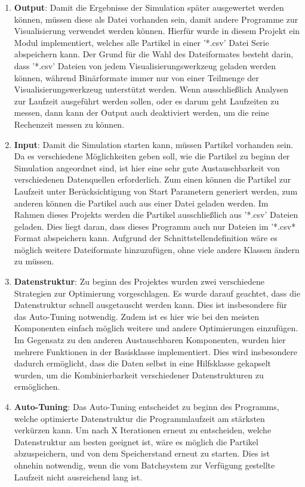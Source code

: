 \documentclass[
12pt,
a4paper,
BCOR10mm,
DIV14,
headsepline,
]{scrreprt}
\begin{document}
	\begin{enumerate}
		\item \textbf{Output}: Damit die Ergebnisse der Simulation später ausgewertet werden können, müssen diese als Datei vorhanden sein, damit andere Programme zur Visualisierung verwendet werden können. Hierfür wurde in diesem Projekt ein Modul implementiert, welches alle Partikel in einer '*.csv' Datei Serie abspeichern kann. Der Grund für die Wahl des Dateiformates besteht darin, dass '*.csv' Dateien von jedem Visualisierungswerkzeug geladen werden können, während Binärformate immer nur von einer Teilmenge der Visualisierungswerkzeug unterstützt werden. Wenn ausschließlich Analysen zur Laufzeit ausgeführt werden sollen, oder es darum geht Laufzeiten zu messen, dann kann der Output auch deaktiviert werden, um die reine Rechenzeit messen zu können.
		\item \textbf{Input}: Damit die Simulation starten kann, müssen Partikel vorhanden sein. Da es verschiedene Möglichkeiten geben soll, wie die Partikel zu beginn der Simulation angeordnet sind, ist hier eine sehr gute Austauschbarkeit von verschiedenen Datenquellen erforderlich. Zum einen können die Partikel zur Laufzeit unter Berücksichtigung von Start Parametern generiert werden, zum anderen können die Partikel auch aus einer Datei geladen werden. Im Rahmen dieses Projekts werden die Partikel ausschließlich aus '*.csv' Dateien geladen. Dies liegt daran, dass dieses Programm auch nur Dateien im '*.csv* Format abspeichern kann. Aufgrund der Schnittstellendefinition wäre es möglich weitere Dateiformate hinzuzufügen, ohne viele andere Klassen ändern zu müssen.
		\item \textbf{Datenstruktur}: Zu beginn des Projektes wurden zwei verschiedene Strategien zur Optimierung vorgeschlagen. Es wurde darauf geachtet, dass die Datenstruktur schnell ausgetauscht werden kann. Dies ist insbesondere für das Auto-Tuning notwendig. Zudem ist es hier wie bei den meisten Komponenten einfach möglich weitere und andere Optimierungen einzufügen. Im Gegensatz zu den anderen Austauschbaren Komponenten, wurden hier mehrere Funktionen in der Basisklasse implementiert. Dies wird insbesondere dadurch ermöglicht, dass die Daten selbst in eine Hilfsklasse gekapselt wurden, um die Kombinierbarkeit verschiedener Datenstrukturen zu ermöglichen.
		\item \textbf{Auto-Tuning}:	Das Auto-Tuning entscheidet zu beginn des Programms, welche optimierte Datenstruktur die Programmlaufzeit am stärksten verkürzen kann. Um nach X Iterationen erneut zu entscheiden, welche Datenstruktur am besten geeignet ist, wäre es möglich die Partikel abzuspeichern, und von dem Speicherstand erneut zu starten. Dies ist ohnehin notwendig, wenn die vom Batchsystem zur Verfügung gestellte Laufzeit nicht ausreichend lang ist.

\end{enumerate}
\end{document}
